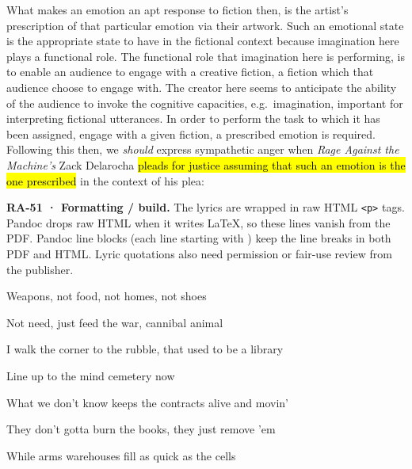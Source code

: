 \documentclass[
  letterpaper,
  DIV=11,
  numbers=noendperiod]{scrartcl}
\theoremstyle{remark}
\begin{document}
What makes an emotion an apt response to fiction then, is the artist's
prescription of that particular emotion via their artwork. Such an
emotional state is the appropriate state to have in the fictional
context because imagination here plays a functional role. The functional
role that imagination here is performing, is to enable an audience to
engage with a creative fiction, a fiction which that audience choose to
engage with. The creator here seems to anticipate the ability of the
audience to invoke the cognitive capacities, e.g.~imagination, important
for interpreting fictional utterances. In order to perform the task to
which it has been assigned, engage with a given fiction, a prescribed
emotion is required. Following this then, we \emph{should} express
sympathetic anger when \emph{Rage Against the Machine's} Zack Delarocha
\hl{pleads for justice assuming that such an emotion is the one
prescribed} in the context of his plea:

\begin{tcolorbox}[enhanced jigsaw, arc=.35mm, bottomrule=.15mm, bottomtitle=1mm, breakable, colback=white, colbacktitle=quarto-callout-note-color!10!white, colframe=quarto-callout-note-color-frame, coltitle=black, left=2mm, leftrule=.75mm, opacityback=0, opacitybacktitle=0.6, rightrule=.15mm, title=\textcolor{quarto-callout-note-color}{\faInfo}\hspace{0.5em}{Note}, titlerule=0mm, toprule=.15mm, toptitle=1mm]

\textbf{RA-51 · Formatting / build.} The lyrics are wrapped in raw HTML
\texttt{\textless{}p\textgreater{}} tags. Pandoc drops raw HTML when it
writes LaTeX, so these lines vanish from the PDF. Pandoc line blocks
(each line starting with \texttt{\textbar{}}) keep the line breaks in
both PDF and HTML. Lyric quotations also need permission or fair-use
review from the publisher.

\end{tcolorbox}

Weapons, not food, not homes, not shoes

Not need, just feed the war, cannibal animal

I walk the corner to the rubble, that used to be a library

Line up to the mind cemetery now

What we don't know keeps the contracts alive and movin'

They don't gotta burn the books, they just remove 'em

While arms warehouses fill as quick as the cells
\end{document}
